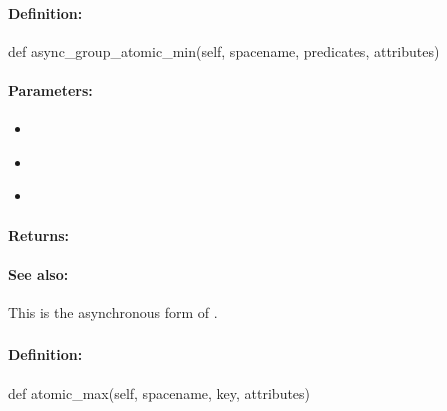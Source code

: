 \paragraph{Definition:}
\begin{pythoncode}
def async_group_atomic_min(self, spacename, predicates, attributes)
\end{pythoncode}

\paragraph{Parameters:}
\begin{itemize}[noitemsep]
\item {}\\

\item {}\\

\item {}\\

\end{itemize}

\paragraph{Returns:}


\paragraph{See also:}  This is the asynchronous form of .

\pagebreak
\subsubsection{}
\label{api:python:atomic_max}


\paragraph{Definition:}
\begin{pythoncode}
def atomic_max(self, spacename, key, attributes)
\end{pythoncode}

